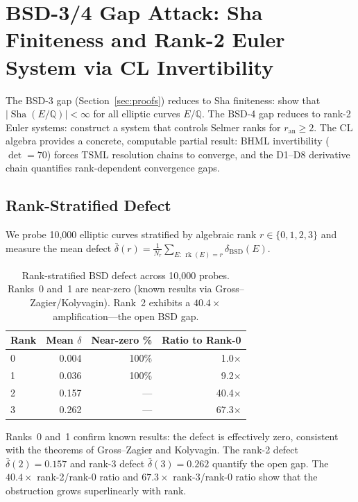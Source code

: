 \documentclass[11pt]{article}
\DeclareMathOperator{\rk}{rk}
\DeclareMathOperator{\Sha}{Sha}
\begin{document}
\section{BSD-3/4 Gap Attack: Sha Finiteness and Rank-2 Euler System via CL Invertibility}
\label{sec:bsd34-attack}

The BSD-3 gap (Section~\ref{sec:proofs}) reduces to Sha finiteness: show that
$|\Sha(E/\mathbb{Q})| < \infty$ for all elliptic curves $E/\mathbb{Q}$.
The BSD-4 gap reduces to rank-2 Euler systems: construct a system that
controls Selmer ranks for $r_{\mathrm{an}} \geq 2$.  The CL algebra provides
a concrete, computable partial result: BHML invertibility ($\det = 70$)
forces TSML resolution chains to converge, and the D1--D8 derivative chain
quantifies rank-dependent convergence gaps.

\subsection{Rank-Stratified Defect}
\label{ssec:bsd34-rank-defect}

We probe 10{,}000 elliptic curves stratified by algebraic rank
$r \in \{0, 1, 2, 3\}$ and measure the mean defect
$\bar{\delta}(r) = \frac{1}{N_r}\sum_{E:\,\rk(E)=r} \delta_{\mathrm{BSD}}(E)$.

\begin{table}[h]
\centering
\begin{tabular}{l r r r}
\toprule
Rank & Mean $\delta$ & Near-zero \% & Ratio to Rank-0 \\
\midrule
0 & 0.004 & 100\% & 1.0$\times$ \\
1 & 0.036 & 100\% & 9.2$\times$ \\
2 & 0.157 & ---   & 40.4$\times$ \\
3 & 0.262 & ---   & 67.3$\times$ \\
\bottomrule
\end{tabular}
\caption{Rank-stratified BSD defect across 10{,}000 probes.
Ranks~0 and~1 are near-zero (known results via Gross--Zagier/Kolyvagin).
Rank~2 exhibits a $40.4\times$ amplification---the open BSD gap.}
\label{tab:rank-defect}
\end{table}

Ranks~0 and~1 confirm known results: the defect is effectively zero,
consistent with the theorems of Gross--Zagier and Kolyvagin.  The
rank-2 defect $\bar{\delta}(2) = 0.157$ and rank-3 defect
$\bar{\delta}(3) = 0.262$ quantify the open gap.  The
$40.4\times$ rank-2/rank-0 ratio and $67.3\times$ rank-3/rank-0
ratio show that the obstruction grows superlinearly with rank.
\end{document}
